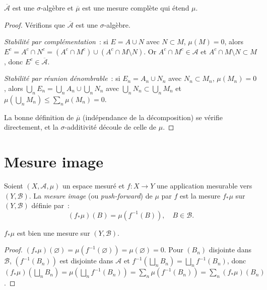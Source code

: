 \begin{proposition}
$\overline{\mathcal{A}}$ est une $\sigma$-alg\`ebre et $\overline{\mu}$ est une
mesure compl\`ete qui \'etend $\mu$.
\end{proposition}

\begin{proof}
V\'erifions que $\overline{\mathcal{A}}$ est une $\sigma$-alg\`ebre.

\emph{Stabilit\'e par compl\'ementation}~: si $E = A \cup N$ avec $N \subset M$,
$\mu(M) = 0$, alors $E^c = A^c \cap N^c = (A^c \cap M^c) \cup (A^c \cap M
\setminus N)$. Or $A^c \cap M^c \in \mathcal{A}$ et $A^c \cap M \setminus N
\subset M$, donc $E^c \in \overline{\mathcal{A}}$.

\emph{Stabilit\'e par r\'eunion d\'enombrable}~: si $E_n = A_n \cup N_n$ avec
$N_n \subset M_n$, $\mu(M_n) = 0$, alors $\bigcup_n E_n = \bigcup_n A_n \cup
\bigcup_n N_n$ avec $\bigcup_n N_n \subset \bigcup_n M_n$ et
$\mu(\bigcup_n M_n) \leq \sum_n \mu(M_n) = 0$.

La bonne d\'efinition de $\overline{\mu}$ (ind\'ependance de la d\'ecomposition)
se v\'erifie directement, et la $\sigma$-additivit\'e d\'ecoule de celle de $\mu$.
\end{proof}

\section{Mesure image}

\begin{definition}
Soient $(X, \mathcal{A}, \mu)$ un espace mesur\'e et $f : X \to Y$ une application
mesurable vers $(Y, \mathcal{B})$. La \emph{mesure image} (ou \emph{push-forward})
de $\mu$ par $f$ est la mesure $f_*\mu$ sur $(Y, \mathcal{B})$ d\'efinie par~:
\[
(f_*\mu)(B) = \mu(f^{-1}(B)), \quad B \in \mathcal{B}.
\]
\end{definition}

\begin{proposition}
$f_*\mu$ est bien une mesure sur $(Y, \mathcal{B})$.
\end{proposition}

\begin{proof}
$(f_*\mu)(\varnothing) = \mu(f^{-1}(\varnothing)) = \mu(\varnothing) = 0$. Pour
$(B_n)$ disjointe dans $\mathcal{B}$, $(f^{-1}(B_n))$ est disjointe dans
$\mathcal{A}$ et $f^{-1}(\bigsqcup_n B_n) = \bigsqcup_n f^{-1}(B_n)$, donc
$(f_*\mu)(\bigsqcup_n B_n) = \mu(\bigsqcup_n f^{-1}(B_n)) = \sum_n
\mu(f^{-1}(B_n)) = \sum_n (f_*\mu)(B_n)$.
\end{proof}

